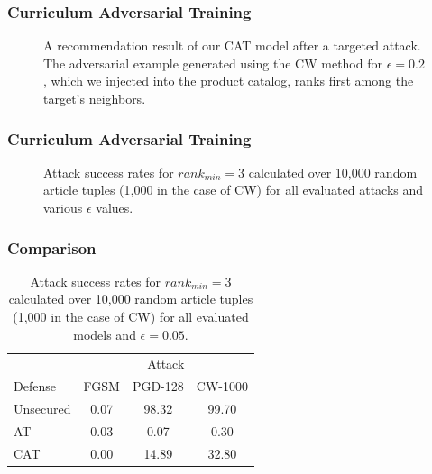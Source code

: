 \documentclass{beamer}
\begin{document}
	\begin{frame}
		\frametitle{Curriculum Adversarial Training}
		\begin{figure}[H]
			\centering
			\resizebox{\textwidth}{!}{}
			\caption{A recommendation result of our CAT model after a targeted attack. The adversarial example generated using the CW method for $\epsilon=0.2$, which we injected into the product catalog, ranks first among the target's neighbors.}
			\label{fig:curr-adv-reco}
		\end{figure}
	\end{frame}
	
	\begin{frame}
		\frametitle{Curriculum Adversarial Training}
		\begin{figure}[H]
			\centering
			\resizebox{\textwidth}{!}{}
			\caption{Attack success rates for $rank_{min}=3$ calculated over 10,000 random article tuples (1,000 in the case of CW) for all evaluated attacks and various $\epsilon$ values.}
			\label{fig:top3-curriculum-adv-success}
		\end{figure}
	\end{frame}
	
	
	\begin{frame}
		\frametitle{Comparison}
		\begin{table}[H]
			\centering
			\begin{tabular}{ lccc } 
				\toprule		
				& \multicolumn{3}{c}{Attack} \\
				\cmidrule{2-4}
				Defense & FGSM & PGD-128 & CW-1000 \\
				\midrule
				Unsecured  						& 0.07  & 98.32 & 99.70 \\
				AT			& 0.03  & 0.07  & 0.30 \\
				CAT & 0.00  & 14.89 & 32.80 \\
				\bottomrule
			\end{tabular}
			\caption{Attack success rates for $rank_{min}=3$ calculated over 10,000 random article tuples (1,000 in the case of CW) for all evaluated models and $\epsilon=0.05$.}
			\label{tab:defense-results}
		\end{table}
	\end{frame}
	
\end{document}
